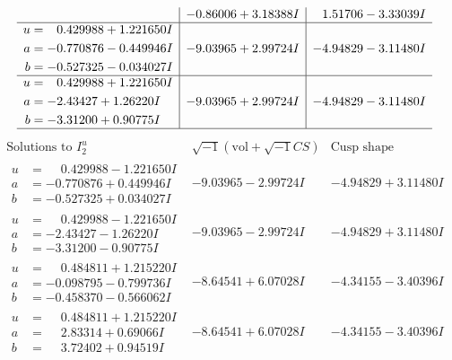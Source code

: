 \documentclass[1p]{elsarticle_modified}
\theoremstyle{definition}
\newcommand{\I}{\sqrt{-1}}
\begin{document}
$$\begin{array}{c|c|c}
 & -0.86006 + 3.18388 I & \phantom{-}1.51706 - 3.33039 I \\ \hline\begin{aligned}
u &= \phantom{-}0.429988 + 1.221650 I \\
a &= -0.770876 - 0.449946 I \\
b &= -0.527325 - 0.034027 I\end{aligned}
 & -9.03965 + 2.99724 I & -4.94829 - 3.11480 I \\ \hline\begin{aligned}
u &= \phantom{-}0.429988 + 1.221650 I \\
a &= -2.43427 + 1.26220 I \\
b &= -3.31200 + 0.90775 I\end{aligned}
 & -9.03965 + 2.99724 I & -4.94829 - 3.11480 I\\
 \hline 
 \end{array}$$\newpage$$\begin{array}{c|c|c}  
\text{Solutions to }I^u_{2}& \I (\text{vol} + \sqrt{-1}CS) & \text{Cusp shape}\\
 \hline 
\begin{aligned}
u &= \phantom{-}0.429988 - 1.221650 I \\
a &= -0.770876 + 0.449946 I \\
b &= -0.527325 + 0.034027 I\end{aligned}
 & -9.03965 - 2.99724 I & -4.94829 + 3.11480 I \\ \hline\begin{aligned}
u &= \phantom{-}0.429988 - 1.221650 I \\
a &= -2.43427 - 1.26220 I \\
b &= -3.31200 - 0.90775 I\end{aligned}
 & -9.03965 - 2.99724 I & -4.94829 + 3.11480 I \\ \hline\begin{aligned}
u &= \phantom{-}0.484811 + 1.215220 I \\
a &= -0.098795 - 0.799736 I \\
b &= -0.458370 - 0.566062 I\end{aligned}
 & -8.64541 + 6.07028 I & -4.34155 - 3.40396 I \\ \hline\begin{aligned}
u &= \phantom{-}0.484811 + 1.215220 I \\
a &= \phantom{-}2.83314 + 0.69066 I \\
b &= \phantom{-}3.72402 + 0.94519 I\end{aligned}
 & -8.64541 + 6.07028 I & -4.34155 - 3.40396 I \\ \hline\begin{aligned}

\end{aligned}
\end{array}$$
\end{document}
